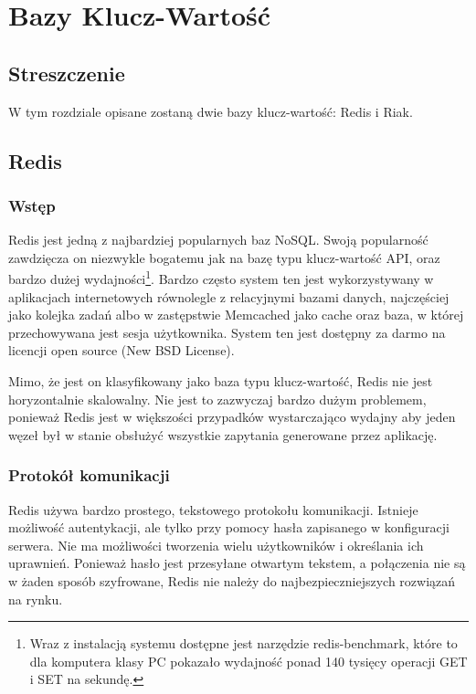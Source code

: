 \chapter{Bazy Klucz-Wartość}

\section*{Streszczenie}
W tym rozdziale opisane zostaną dwie bazy klucz-wartość: Redis i Riak.

\section{Redis}
\label{sec:redis}

\subsection*{Wstęp} 

Redis jest jedną z najbardziej popularnych baz NoSQL.
Swoją popularność zawdzięcza on niezwykle bogatemu jak na bazę typu klucz-wartość API, oraz bardzo dużej wydajności\footnote{Wraz z instalacją systemu dostępne jest narzędzie redis-benchmark, które to dla komputera klasy PC pokazało wydajność ponad 140 tysięcy operacji GET i SET na sekundę.}.
Bardzo często system ten jest wykorzystywany w aplikacjach internetowych równolegle z relacyjnymi bazami danych, najczęściej jako kolejka zadań albo w zastępstwie Memcached jako cache oraz baza, w której przechowywana jest sesja użytkownika.
System ten jest dostępny za darmo na licencji open source (New BSD License).

Mimo, że jest on klasyfikowany jako baza typu klucz-wartość, Redis nie jest horyzontalnie skalowalny.
Nie jest to zazwyczaj bardzo dużym problemem, ponieważ Redis jest w większości przypadków wystarczająco wydajny aby jeden węzeł był w stanie obsłużyć wszystkie zapytania generowane przez aplikację.

\subsection*{Protokół komunikacji}

Redis używa bardzo prostego, tekstowego protokołu komunikacji.
Istnieje możliwość autentykacji, ale tylko przy pomocy hasła zapisanego w konfiguracji serwera.
Nie ma możliwości tworzenia wielu użytkowników i określania ich uprawnień.
Ponieważ hasło jest przesyłane otwartym tekstem, a połączenia nie są w żaden sposób szyfrowane, Redis nie należy do najbezpieczniejszych rozwiązań na rynku.


